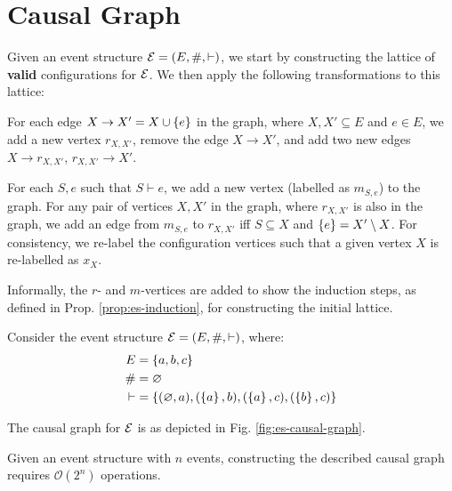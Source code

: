 \section{Causal Graph}

Given an event structure $\mathcal{E} = (E, \#, \vdash)$, we start by constructing
the lattice of \textbf{valid} configurations for $\mathcal{E}$. We then apply the following
transformations to this lattice:

For each edge $X \rightarrow X' = X \cup \left\{ e \right\}$ in the graph,
where $X, X' \subseteq E$ and $e \in E$,
we add a new vertex $r_{X,X'}$, remove the edge $X \rightarrow X'$,
and add two new edges $X \rightarrow r_{X,X'}$, $r_{X,X'} \rightarrow X'$.

For each $S, e$ such that $S \vdash e$, we add a new vertex
(labelled as $m_{S,e}$) to the graph. For any pair of vertices
$X, X'$ in the graph, where $r_{X,X'}$ is also in the graph, we add
an edge from $m_{S,e}$ to $r_{X,X'}$ iff $S \subseteq X$ and
$\left\{ e \right\} = X' \setminus X$. For consistency, we re-label the configuration vertices
such that a given vertex $X$ is re-labelled as $x_{X}$.

Informally, the $r$- and $m$-vertices are added to show the
induction steps, as defined in Prop. \ref{prop:es-induction},
for constructing the initial lattice.

\begin{exmp}\label{ex:es}
Consider the event structure $\mathcal{E} = (E, \#, \vdash)$,
where:
\begin{equation*}
\begin{split}
  E      & = \left\{ a, b, c \right\} \\
  \#     & = \varnothing \\
  \vdash & = \left\{ 
    (\varnothing, a), (\left\{ a \right\}, b), (\left\{ a \right\}, c), (\left\{ b \right\}, c)
   \right\}
\end{split}
\end{equation*}

The causal graph for $\mathcal{E}$ is as depicted in Fig. \ref{fig:es-causal-graph}.



\end{exmp}

\begin{prop}
Given an event structure with $n$ events, constructing the
described causal graph requires $\mathcal{O}(2^n)$ operations.
\end{prop}